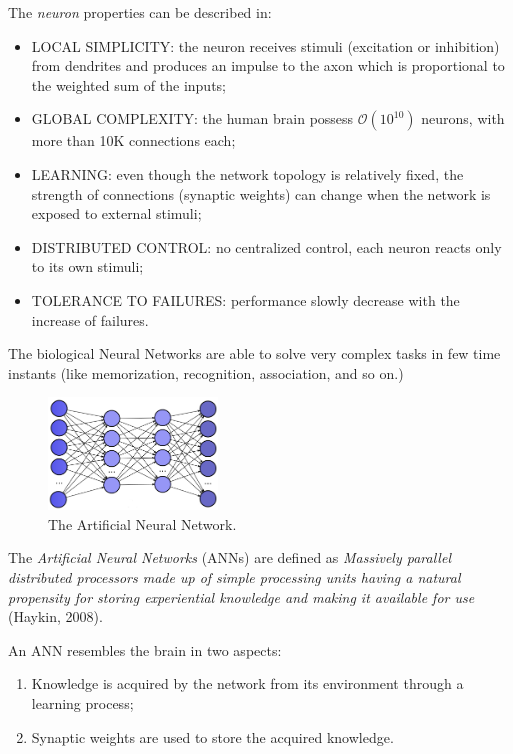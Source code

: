 The \textit{neuron} properties can be described in:
\begin{itemize}
\item LOCAL SIMPLICITY: the neuron receives stimuli (excitation or inhibition) from dendrites and produces an impulse to the axon which is proportional to the weighted sum of the inputs;
\item GLOBAL COMPLEXITY: the human brain possess 
$\mathcal{O}(10^{10})$ 
neurons, with more than 10K connections each;
\item LEARNING: even though the network topology is relatively fixed, the strength of connections (synaptic weights) can change when the network is exposed to external stimuli;
\item DISTRIBUTED CONTROL: no centralized control, each neuron reacts only to its own stimuli;
\item TOLERANCE TO FAILURES: performance slowly decrease with the increase of failures.
\end{itemize}

The biological Neural Networks are able to solve very complex tasks in few time instants (like memorization, recognition, association, and so on.)

\begin{figure}[t]
\centering
\includegraphics[width=0.4\textwidth]{img/ANN}
\caption{The Artificial Neural Network.}
\end{figure}

The \textit{Artificial Neural Networks} (ANNs) are defined as \textit{Massively parallel distributed processors made up of simple processing units having a natural propensity for storing experiential knowledge and making it available for use} (Haykin, 2008).

An ANN resembles the brain in two aspects:
\begin{enumerate}
\item Knowledge is acquired by the network from its environment through a learning process;
\item Synaptic weights are used to store the acquired knowledge.
\end{enumerate}

